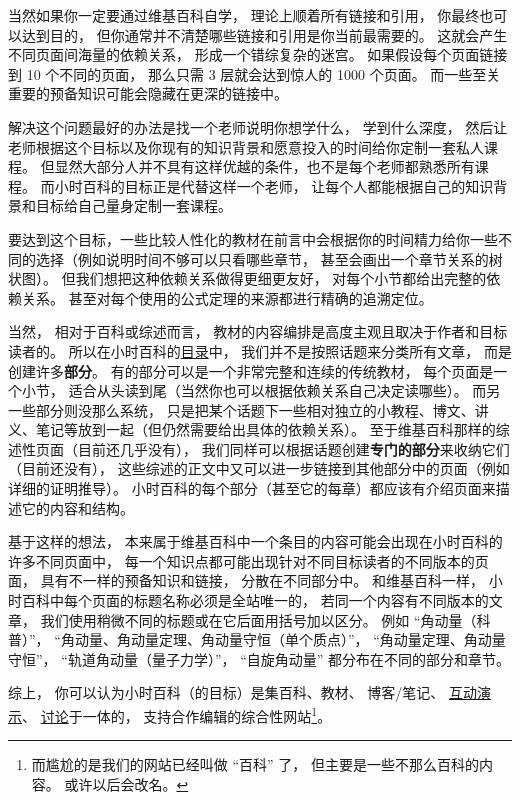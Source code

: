 当然如果你一定要通过维基百科自学， 理论上顺着所有链接和引用， 你最终也可以达到目的， 但你通常并不清楚哪些链接和引用是你当前最需要的。 这就会产生不同页面间海量的依赖关系， 形成一个错综复杂的迷宫。 如果假设每个页面链接到 10 个不同的页面， 那么只需 3 层就会达到惊人的 1000 个页面。 而一些至关重要的预备知识可能会隐藏在更深的链接中。

解决这个问题最好的办法是找一个老师说明你想学什么， 学到什么深度， 然后让老师根据这个目标以及你现有的知识背景和愿意投入的时间给你定制一套私人课程。 但显然大部分人并不具有这样优越的条件，也不是每个老师都熟悉所有课程。 而小时百科的目标正是代替这样一个老师， 让每个人都能根据自己的知识背景和目标给自己量身定制一套课程。

要达到这个目标，一些比较人性化的教材在前言中会根据你的时间精力给你一些不同的选择（例如说明时间不够可以只看哪些章节， 甚至会画出一个章节关系的树状图）。 但我们想把这种依赖关系做得更细更友好， 对每个小节都给出完整的依赖关系。 甚至对每个使用的公式定理的来源都进行精确的追溯定位。

当然， 相对于百科或综述而言， 教材的内容编排是高度主观且取决于作者和目标读者的。 所以在小时百科的\href{http://wuli.wiki/online}{目录}中， 我们并不是按照话题来分类所有文章， 而是创建许多\textbf{部分}。 有的部分可以是一个非常完整和连续的传统教材， 每个页面是一个小节， 适合从头读到尾（当然你也可以根据依赖关系自己决定读哪些）。 而另一些部分则没那么系统， 只是把某个话题下一些相对独立的小教程、博文、讲义、笔记等放到一起（但仍然需要给出具体的依赖关系）。 至于维基百科那样的综述性页面（目前还几乎没有）， 我们同样可以根据话题创建\textbf{专门的部分}来收纳它们（目前还没有）， 这些综述的正文中又可以进一步链接到其他部分中的页面（例如详细的证明推导）。 小时百科的每个部分（甚至它的每章）都应该有介绍页面来描述它的内容和结构。

基于这样的想法， 本来属于维基百科中一个条目的内容可能会出现在小时百科的许多不同页面中， 每一个知识点都可能出现针对不同目标读者的不同版本的页面， 具有不一样的预备知识和链接， 分散在不同部分中。 和维基百科一样， 小时百科中每个页面的标题名称必须是全站唯一的， 若同一个内容有不同版本的文章， 我们使用稍微不同的标题或在它后面用括号加以区分。 例如 “角动量（科普）”， “角动量、角动量定理、角动量守恒（单个质点）”， “角动量定理、角动量守恒”， “轨道角动量（量子力学）”， “自旋角动量” 都分布在不同的部分和章节。

综上， 你可以认为小时百科（的目标）是集百科、教材、 博客/笔记、 \href{http://wuli.wiki/apps}{互动演示}、 \href{http://wuli.wiki/forum}{讨论}于一体的， 支持合作编辑的综合性网站\footnote{而尴尬的是我们的网站已经叫做 “百科” 了， 但主要是一些不那么百科的内容。 或许以后会改名。}。

